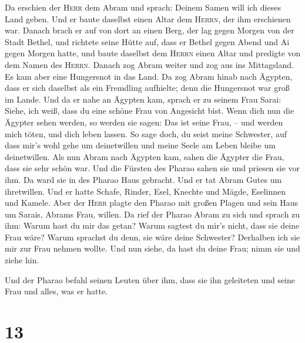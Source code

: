  Da erschien der \textsc{Herr} dem Abram und sprach:
Deinem Samen will ich dieses Land geben. Und er baute daselbst einen
Altar dem \textsc{Herrn}, der ihm erschienen war.  Danach
brach er auf von dort an einen Berg, der lag gegen Morgen von der Stadt
Bethel, und richtete seine Hütte auf, dass er Bethel gegen Abend und Ai
gegen Morgen hatte, und baute daselbst dem \textsc{Herrn} einen Altar
und predigte von dem Namen des \textsc{Herrn}.  Danach zog
Abram weiter und zog aus ins Mittagsland.  Es kam aber
eine Hungersnot in das Land. Da zog Abram hinab nach Ägypten, dass er
sich daselbst als ein Fremdling aufhielte; denn die Hungersnot war groß
im Lande.  Und da er nahe an Ägypten kam, sprach er zu
seinem Frau Sarai: Siehe, ich weiß, dass du eine schöne Frau von
Angesicht bist.  Wenn dich nun die Ägypter sehen werden,
so werden sie sagen: Das ist seine Frau, -- und werden mich töten, und
dich leben lassen.  So sage doch, du seist meine
Schwester, auf dass mir's wohl gehe um deinetwillen und meine Seele am
Leben bleibe um deinetwillen.  Als nun Abram nach Ägypten
kam, sahen die Ägypter die Frau, dass sie sehr schön war.
 Und die Fürsten des Pharao sahen sie und priesen sie vor
ihm. Da ward sie in des Pharao Haus gebracht.  Und er tat
Abram Gutes um ihretwillen. Und er hatte Schafe, Rinder, Esel, Knechte
und Mägde, Eselinnen und Kamele.  Aber der \textsc{Herr}
plagte den Pharao mit großen Plagen und sein Haus um Sarais, Abrams
Frau, willen.  Da rief der Pharao Abram zu sich und
sprach zu ihm: Warum hast du mir das getan? Warum sagtest du mir's
nicht, dass sie deine Frau wäre?  Warum sprachst du denn,
sie wäre deine Schwester? Derhalben ich sie mir zur Frau nehmen wollte.
Und nun siehe, da hast du deine Frau; nimm sie und ziehe hin.

 Und der Pharao befahl seinen Leuten über ihm, dass sie
ihn geleiteten und seine Frau und alles, was er hatte.

\hypertarget{section-12}{%
\section{13}\label{section-12}}

